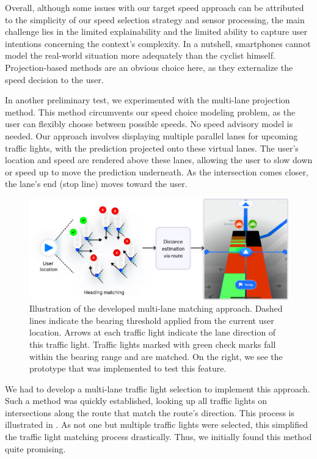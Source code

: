 Overall, although some issues with our target speed approach can be attributed to the simplicity of our speed selection strategy and sensor processing, the main challenge lies in the limited explainability and the limited ability to capture user intentions concerning the context's complexity. In a nutshell, smartphones cannot model the real-world situation more adequately than the cyclist himself. Projection-based methods are an obvious choice here, as they externalize the speed decision to the user.

In another preliminary test, we experimented with the multi-lane projection method. This method circumvents our speed choice modeling problem, as the user can flexibly choose between possible speeds. No speed advisory model is needed. Our approach involves displaying multiple parallel lanes for upcoming traffic lights, with the prediction projected onto these virtual lanes. The user's location and speed are rendered above these lanes, allowing the user to slow down or speed up to move the prediction underneath. As the intersection comes closer, the lane's end (stop line) moves toward the user. 

\begin{figure}[t]
\centering
\includegraphics[width=\linewidth]{images/multi-lane-view.pdf}
\caption{Illustration of the developed multi-lane matching approach. Dashed lines indicate the bearing threshold applied from the current user location. Arrows at each traffic light indicate the lane direction of this traffic light. Traffic lights marked with green check marks fall within the bearing range and are matched. On the right, we see the prototype that was implemented to test this feature.}
\label{fig:multi-lane-view}
\end{figure}

We had to develop a multi-lane traffic light selection to implement this approach. Such a method was quickly established, looking up all traffic lights on intersections along the route that match the route's direction. This process is illustrated in . As not one but multiple traffic lights were selected, this simplified the traffic light matching process drastically. Thus, we initially found this method quite promising.

